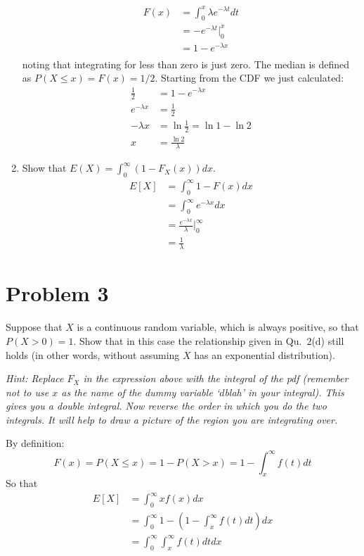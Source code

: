 \documentclass{article}
\newcommand{\1}{\mathbf{1}}
\begin{document}
\begin{enumerate}
    \begin{align*}
        F(x) &= \int_{0}^{x} \lambda e^{-\lambda t} dt \\
            &= -e^{-\lambda t}|_{0}^{x} \\
            &= 1-e^{-\lambda x} \\
    \end{align*}
    noting that integrating for less than zero is just zero. The median is defined as $P(X\leq x) = F(x) = 1/2$. Starting from the CDF we just calculated:
    \begin{align*}
        \frac{1}{2} &= 1 - e^{-\lambda x} \\
        e^{-\lambda x} &= \frac{1}{2} \\
        -\lambda{x} &= \ln\frac{1}{2} = \ln1 - \ln2 \\
        x &= \frac{\ln2}{\lambda}
    \end{align*}
    
    \newpage
    \item Show that $E(X) = \int_0^\infty (1-F_X(x)) dx.$
    \begin{align*}
        E[X] &= \int_0^\infty 1-F(x) dx \\
        &= \int_0^\infty e^{-\lambda x} dx \\
        &= \frac{e^{-\lambda x}}{\lambda} \bigg|_0^\infty \\
        &=\frac{1}{\lambda}
    \end{align*}
\end{enumerate}	
	


\newpage
\section*{Problem 3}
Suppose that $X$ is a continuous random variable, which is always positive, so that $P(X> 0)=1$.
Show that in this case the relationship given in Qu.~2(d) still holds (in other words, without assuming $X$ has
an exponential distribution).\par
{\it Hint: Replace $F_X$ in the expression above with the integral of the pdf (remember not to use $x$ as the name of the dummy variable `$d$blah' in your integral). This gives you a double integral. Now reverse the order in which you do the two integrals. It will help to draw a picture of the region you are integrating over.}

By definition:
$$ F(x) = P(X\leq x) = 1 - P(X>x) = 1 - \int_x^\infty f(t) dt$$
So that
\begin{align*}
    E[X] &=  \int_0^\infty xf(x) dx \\
    &=\int_0^\infty 1- \left(1 - \int_x^\infty f(t) dt\right) dx \\
    &= \int_0^\infty\int_x^\infty f(t) dtdx 
\end{align*}
\end{document}
